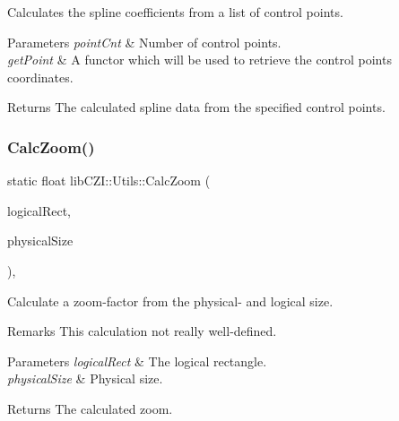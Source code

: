Calculates the spline coefficients from a list of control points. 
\begin{DoxyParams}{Parameters}
{\em point\+Cnt} & Number of control points. \\
\hline
{\em get\+Point} & A functor which will be used to retrieve the control point\textquotesingle{}s coordinates. \\
\hline
\end{DoxyParams}
\begin{DoxyReturn}{Returns}
The calculated spline data from the specified control points. 
\end{DoxyReturn}
\mbox{\label{classlib_c_z_i_1_1_utils_aef8fdee9516bf45c9eaa4b28862aa8fc}} 
\subsubsection{\texorpdfstring{Calc\+Zoom()}{CalcZoom()}\hspace{0.1cm}{\footnotesize\ttfamily [1/2]}}
{\footnotesize\ttfamily static float lib\+C\+Z\+I\+::\+Utils\+::\+Calc\+Zoom (\begin{DoxyParamCaption}\item[{const \hyperlink{structlib_c_z_i_1_1_int_rect}{lib\+C\+Z\+I\+::\+Int\+Rect} \&}]{logical\+Rect,  }\item[{const \hyperlink{structlib_c_z_i_1_1_int_size}{lib\+C\+Z\+I\+::\+Int\+Size} \&}]{physical\+Size }\end{DoxyParamCaption})\hspace{0.3cm}{\ttfamily [inline]}, {\ttfamily [static]}}

Calculate a zoom-\/factor from the physical-\/ and logical size. \begin{DoxyRemark}{Remarks}
This calculation not really well-\/defined. 
\end{DoxyRemark}

\begin{DoxyParams}{Parameters}
{\em logical\+Rect} & The logical rectangle. \\
\hline
{\em physical\+Size} & Physical size. \\
\hline
\end{DoxyParams}
\begin{DoxyReturn}{Returns}
The calculated zoom. 
\end{DoxyReturn}
\mbox{\label{classlib_c_z_i_1_1_utils_ac62322c3e738d8a514ca5ee2dcbc6535}} 
